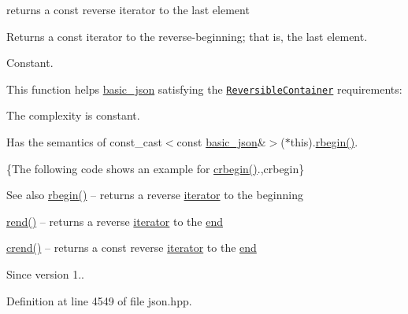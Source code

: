 returns a const reverse iterator to the last element 

Returns a const iterator to the reverse-\/beginning; that is, the last element.

  Constant.

This function helps {\ttfamily \hyperlink{classnlohmann_1_1basic__json}{basic\+\_\+json}} satisfying the \href{http://en.cppreference.com/w/cpp/concept/ReversibleContainer}{\tt Reversible\+Container} requirements\+:
\begin{DoxyItemize}
\item The complexity is constant.
\item Has the semantics of {\ttfamily const\+\_\+cast$<$const \hyperlink{classnlohmann_1_1basic__json}{basic\+\_\+json}\&$>$($\ast$this).\hyperlink{classnlohmann_1_1basic__json_a62ccf5b9b3674aec2403fbc02da03db8}{rbegin()}}.
\end{DoxyItemize}

\{The following code shows an example for {\ttfamily \hyperlink{classnlohmann_1_1basic__json_a43c08a393368eb674d0dcdbe301aafe3}{crbegin()}}.,crbegin\}

\begin{DoxySeeAlso}{See also}
\hyperlink{classnlohmann_1_1basic__json_a62ccf5b9b3674aec2403fbc02da03db8}{rbegin()} -- returns a reverse \hyperlink{classnlohmann_1_1basic__json_ae3c77a8f03096da2a32a3de0c317d445}{iterator} to the beginning 

\hyperlink{classnlohmann_1_1basic__json_aaa160a960dd3dd90856a72b1d8dbe707}{rend()} -- returns a reverse \hyperlink{classnlohmann_1_1basic__json_ae3c77a8f03096da2a32a3de0c317d445}{iterator} to the \hyperlink{classnlohmann_1_1basic__json_a12ccf14d39ddae52f6c7e126105a230b}{end} 

\hyperlink{classnlohmann_1_1basic__json_aae7eb3b91d7f68e86396c5c6b683445f}{crend()} -- returns a const reverse \hyperlink{classnlohmann_1_1basic__json_ae3c77a8f03096da2a32a3de0c317d445}{iterator} to the \hyperlink{classnlohmann_1_1basic__json_a12ccf14d39ddae52f6c7e126105a230b}{end}
\end{DoxySeeAlso}
\begin{DoxySince}{Since}
version 1.. 
\end{DoxySince}


Definition at line 4549 of file json.\+hpp.

\hypertarget{classnlohmann_1_1basic__json_aae7eb3b91d7f68e86396c5c6b683445f}{}
